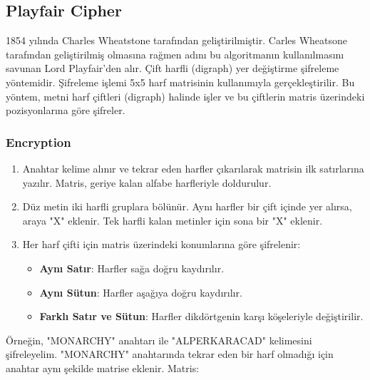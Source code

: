\newpage

\subsection{Playfair Cipher}

1854 yılında Charles Wheatstone tarafından geliştirilmiştir. Carles Wheatsone tarafından geliştirilmiş olmasına rağmen adını bu algoritmanın kullanılmasını savunan Lord Playfair'den alır. Çift harfli (digraph) yer değiştirme şifreleme yöntemidir. Şifreleme işlemi 5x5 harf matrisinin kullanımıyla gerçekleştirilir. Bu yöntem, metni harf çiftleri (digraph) halinde işler ve bu çiftlerin matris üzerindeki pozisyonlarına göre şifreler.

\subsubsection{Encryption}

\begin{enumerate}
    \item Anahtar kelime alınır ve tekrar eden harfler çıkarılarak matrisin ilk satırlarına yazılır. Matris, geriye kalan alfabe harfleriyle doldurulur.
    \item Düz metin iki harfli gruplara bölünür. Aynı harfler bir çift içinde yer alırsa, araya "X" eklenir. Tek harfli kalan metinler için sona bir "X" eklenir.
    \item Her harf çifti için matris üzerindeki konumlarına göre şifrelenir:
    \begin{itemize}
        \item \textbf{Aynı Satır}: Harfler sağa doğru kaydırılır.
        \item \textbf{Aynı Sütun}: Harfler aşağıya doğru kaydırılır.
        \item \textbf{Farklı Satır ve Sütun}: Harfler dikdörtgenin karşı köşeleriyle değiştirilir.
    \end{itemize}
\end{enumerate}

Örneğin, "MONARCHY" anahtarı ile "ALPERKARACAD" kelimesini şifreleyelim. "MONARCHY" anahtarında tekrar eden bir harf olmadığı için anahtar aynı şekilde matrise eklenir. Matris:

\begin{table}[ht]
\centering
{}
\end{table}

